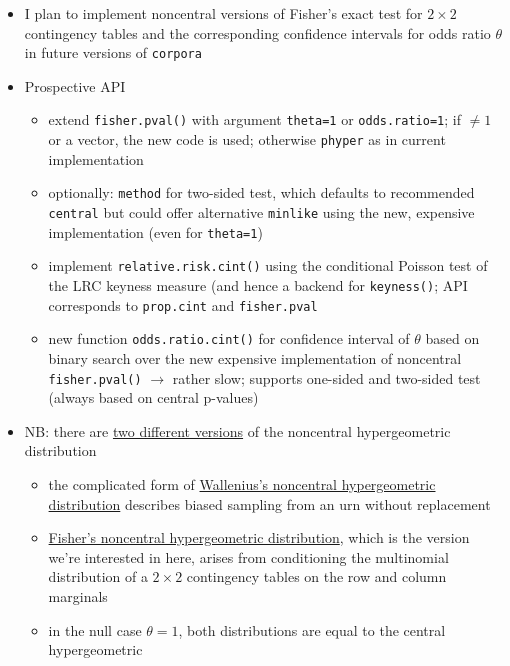 \documentclass[a4paper]{article}
\begin{document}
\begin{itemize}
\item I plan to implement noncentral versions of Fisher's exact test for $2\times 2$ contingency tables and the corresponding confidence intervals for odds ratio $\theta$ in future versions of \texttt{corpora}
\item Prospective API
  \begin{itemize}
  \item extend \texttt{fisher.pval()} with argument \texttt{theta=1} or \texttt{odds.ratio=1}; if $\neq 1$ or a vector, the new code is used; otherwise \texttt{phyper} as in current implementation
  \item optionally: \texttt{method} for two-sided test, which defaults to recommended \texttt{central} but could offer alternative \texttt{minlike} using the new, expensive implementation (even for \texttt{theta=1})
  \item implement \texttt{relative.risk.cint()} using the conditional Poisson test of the LRC keyness measure (and hence a backend for \texttt{keyness()}; API corresponds to \texttt{prop.cint} and \texttt{fisher.pval}
  \item new function \texttt{odds.ratio.cint()} for confidence interval of $\theta$ based on binary search over the new expensive implementation of noncentral \texttt{fisher.pval()} $\to$ rather slow; supports one-sided and two-sided test (always based on central p-values)
  \end{itemize}
\item NB: there are \href{https://en.wikipedia.org/wiki/Noncentral_hypergeometric_distributions}{two different versions} of the noncentral hypergeometric distribution
  \begin{itemize}
  \item the complicated form of \href{https://en.wikipedia.org/wiki/Wallenius'_noncentral_hypergeometric_distribution}{Wallenius's noncentral hypergeometric distribution} describes biased sampling from an urn without replacement
  \item \href{https://en.wikipedia.org/wiki/Fisher's_noncentral_hypergeometric_distribution}{Fisher's noncentral hypergeometric distribution}, which is the version we're interested in here, arises from conditioning the multinomial distribution of a $2\times 2$ contingency tables on the row and column marginals
  \item in the null case $\theta = 1$, both distributions are equal to the central hypergeometric
  \end{itemize}

\end{itemize}
\end{document}
